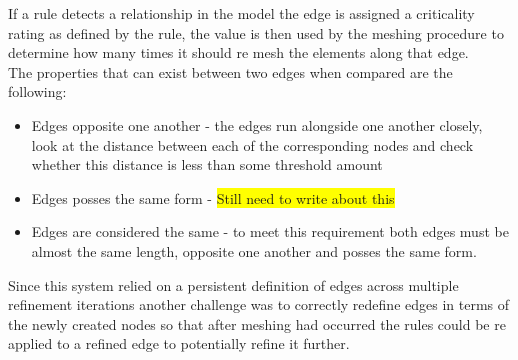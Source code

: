 \noindent
If a rule detects a relationship in the model the edge is assigned a criticality rating as defined by the rule, the value is then used by the meshing procedure to determine how many times it should re mesh the elements along that edge. \\ 
 
The properties that can exist between two edges when compared are the following:
\begin{itemize}
\item Edges opposite one another - the edges run alongside one another closely, look at the distance between each of the corresponding nodes and check whether this distance is less than some threshold amount
\item Edges posses the same form - \colorbox{yellow}{Still need to write about this}

\item Edges are considered the same - to meet this requirement both edges must be almost the same length, opposite one another and posses the same form.

\end{itemize}

\noindent
Since this system relied on a persistent definition of edges across multiple refinement iterations another challenge was to correctly redefine edges in terms of the newly created nodes so that after meshing had occurred the rules could be re applied to a refined edge to potentially refine it further.

